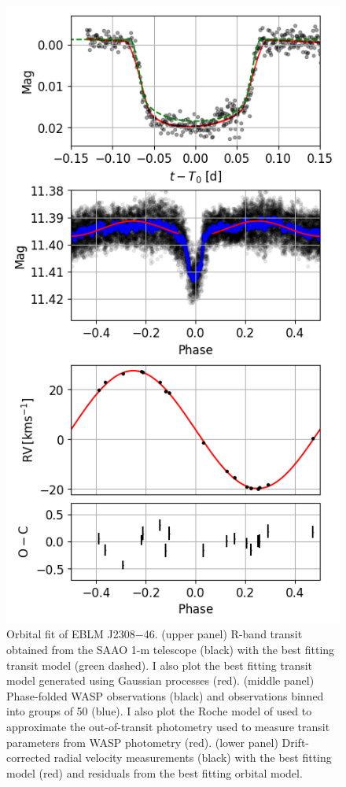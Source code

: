 \begin{figure}[htb]
  \centering
  \includegraphics[scale=0.8]{8-Results/J2308-46/orbital.png}
  \caption{Orbital fit of EBLM J2308$-$46. (upper panel) R-band transit obtained from the SAAO 1-m telescope (black) with the best fitting transit model (green dashed). I also plot the best fitting transit model generated using Gaussian processes (red). (middle panel) Phase-folded WASP observations (black) and observations binned into groups of 50 (blue). I also plot the Roche model of used to approximate the out-of-transit photometry used to measure transit parameters from WASP photometry (red).  (lower panel) Drift-corrected radial velocity measurements (black) with the best fitting model (red) and residuals from the best fitting orbital model.}
  \label{fig:J2308-46:orbit}
\end{figure}


